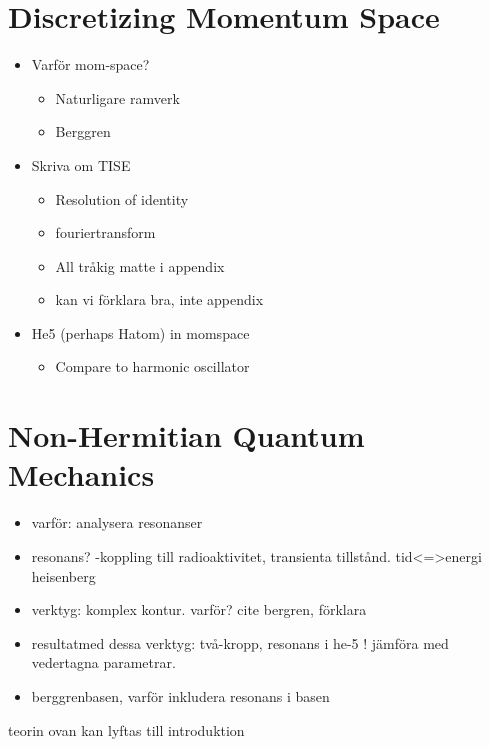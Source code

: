 \documentclass[12pt,a4paper]{report}
\begin{document}


\chapter{Discretizing Momentum Space} %
\label{cha:discretizing_momentum_space}

\begin{itemize}
  \item Varför mom-space? 
  \begin{itemize}
    \item Naturligare ramverk
    \item Berggren
  \end{itemize}
  \item Skriva om TISE
  \begin{itemize}
    \item Resolution of identity
    \item fouriertransform
    \item All tråkig matte i appendix
    \item kan vi förklara bra, inte appendix
  \end{itemize}
  \item He5 (perhaps Hatom) in momspace
  \begin{itemize}
    \item Compare to harmonic oscillator
  \end{itemize}
\end{itemize}

%

\chapter{Non-Hermitian Quantum Mechanics} %
\label{cha:non_hermitian_quantum_mechanics}

\begin{itemize}
  \item varför: analysera resonanser
  \item resonans? -koppling till radioaktivitet, transienta tillstånd. tid<=>energi heisenberg
  \item verktyg: komplex kontur. varför? cite bergren, förklara 
  \item resultatmed dessa verktyg: två-kropp, resonans i he-5 ! jämföra med vedertagna parametrar. 
  \item berggrenbasen, varför inkludera resonans i basen
\end{itemize}
teorin ovan kan lyftas till introduktion
\end{document}
